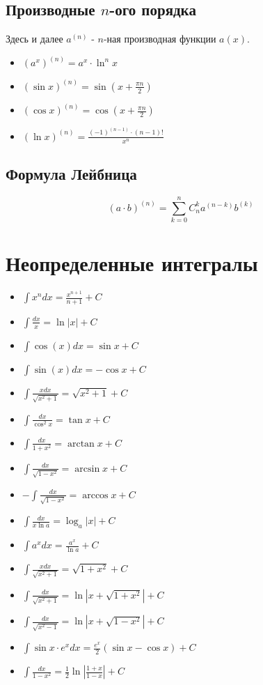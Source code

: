 \documentclass{article}
\begin{document}
	\subsection{Производные $n$-ого порядка}
	Здесь и далее $a^{(n)}$ - $n$-ная производная функции $a(x)$.
	\begin{itemize}
		\item $(a^x)^{(n)}=a^x \cdot \ln^n{x} $
		\item $(\sin{x})^{(n)}=\sin{(x+\frac{\pi n}{2})}$
		\item $(\cos{x})^{(n)}=\cos{(x+\frac{\pi n}{2})}$
		\item $(\ln{x})^{(n)}=\frac{(-1)^{(n-1)}\cdot (n-1)!}{x^n}$
	\end{itemize}
	\subsection{Формула Лейбница}
	$$(a\cdot b)^{(n)}=\sum_{k=0}^n C^k_na^{(n-k)}b^{(k)}$$
	
	\section{Неопределенные интегралы}
	\begin{itemize}
		\item $\int{x^ndx}=\frac{x^{n+1}}{n+1}+C$
		\item $\int \frac{dx}{x} = \ln{|x|} + C$
		\item $\int{\cos{(x)}}dx = \sin{x} + C$
		\item $\int{\sin{(x)}}dx = - \cos{x} + C$
		\item $\int{\frac{xdx}{\sqrt{x^2+1}}} = \sqrt{x^2+1}+C$
		\item $\int\frac{dx}{\cos^2{x}} = \tan{x} +C$
		\item $\int\frac{dx}{1+x^2}=\arctan{x} +C$
		\item $\int\frac{dx}{\sqrt{1-x^2}} = \arcsin x +C$
		\item $-\int\frac{dx}{\sqrt{1-x^2}} = \arccos x +C$
		\item $\int\frac{dx}{x\ln{a}} = \log_a{|x|}+C$                                                                                                     
		\item $\int a^x dx= \frac{a^x}{\ln{a}}+C$
		\item $\int\frac{x dx}{\sqrt{x^2+1}} = \sqrt{1+x^2}+C$
		\item $\int\frac{dx}{\sqrt{x^2+1}} = \ln|x+\sqrt{1+x^2}|+C$
		\item $\int\frac{dx}{\sqrt{x^2-1}} = \ln|x+\sqrt{1-x^2}|+C$
		\item $\int \sin{x}\cdot e^x dx = \frac{e^x}{2}(\sin{x} - \cos{x})+C$

		\item $\int\frac{dx}{1-x^2} = \frac{1}{2}\ln\left|\frac{1+x}{1-x}\right| + C $

	\end{itemize}

	
\end{document}
